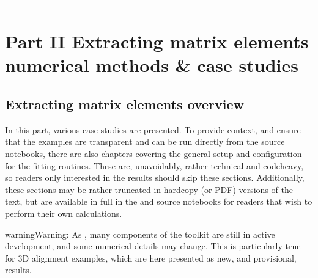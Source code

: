 \documentclass[letterpaper,table,10pt,english]{jupyterBook}
\begin{document}
\bigskip\hrule\bigskip


\sphinxstepscope


\part{Part II \sphinxhyphen{} Extracting matrix elements \sphinxhyphen{} numerical methods \& case studies}

\sphinxstepscope


\chapter{Extracting matrix elements overview}
\label{\detokenize{part2/extracting_matrix_elements_overview_270423:extracting-matrix-elements-overview}}\label{\detokenize{part2/extracting_matrix_elements_overview_270423:chpt-extracting-matrix-elements-overview}}\label{\detokenize{part2/extracting_matrix_elements_overview_270423::doc}}
\sphinxAtStartPar
In this part, various case studies are presented. To provide context, and ensure that the examples are transparent and can be run directly from the source notebooks, there are also chapters covering the general setup and configuration for the fitting routines. These are, unavoidably, rather technical and code\sphinxhyphen{}heavy, so readers only interested in the results should skip these sections. Additionally, these sections may be rather truncated in hard\sphinxhyphen{}copy (or PDF) versions of the text, but are available in full in the  and source notebooks for readers that wish to perform their own calculations.

\begin{sphinxShadowBox}
\sphinxstylesidebartitle{}

\begin{sphinxadmonition}{warning}{Warning:}
\sphinxAtStartPar
As {\hyperref[\detokenize{frontmatter/book_versions_note:sec-numerics-disclaimer}]{}}, many components of the toolkit are still in active development, and some numerical details may change. This is particularly true for 3D alignment examples, which are here presented as new, and provisional, results.
\end{sphinxadmonition}
\end{sphinxShadowBox}
\end{document}
